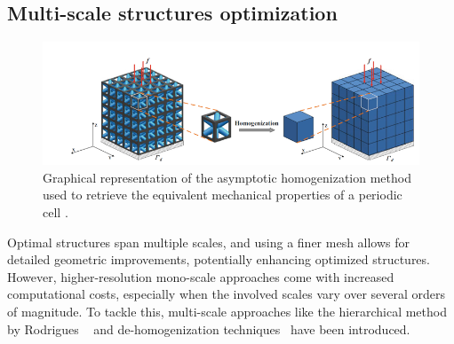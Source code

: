 \subsection{Multi-scale structures optimization}
\begin{figure}
    \centering
    \includegraphics[width=\linewidth]{figures/02_literature/homo.png}
    \caption{Graphical representation of the asymptotic homogenization method used to retrieve the equivalent mechanical properties of a periodic cell \cite{wang_concurrent_2020}.}
    \label{fig:02_homogen}
\end{figure}
Optimal structures span multiple scales, and using a finer mesh allows for detailed geometric improvements, potentially enhancing optimized structures. However, higher-resolution mono-scale approaches come with increased computational costs, especially when the involved scales vary over several orders of magnitude. To tackle this, multi-scale approaches like the hierarchical method by Rodrigues \etal~ and de-homogenization techniques~ have been introduced.

